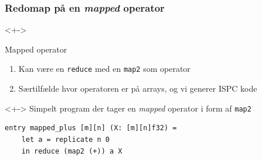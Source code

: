 \documentclass[t]{beamer}
\begin{document}
\begin{frame}[fragile]
  \frametitle{Redomap på en \textit{mapped} operator}
  \begin{onlyenv}<+->
    \begin{block}{Mapped operator}
      \begin{enumerate}
        \item Kan være en \texttt{reduce} med en \texttt{map2} som operator
        \item Særtilfælde hvor operatoren er på arrays, og vi generer ISPC kode
      \end{enumerate}
    \end{block}
  \end{onlyenv}
  \begin{onlyenv}<+->
    Simpelt program der tager en \textit{mapped} operator i form af \texttt{map2}
\begin{lstlisting}[language=futhark]
  entry mapped_plus [m][n] (X: [m][n]f32) =
    let a = replicate n 0
    in reduce (map2 (+)) a X

\end{lstlisting}
  \end{onlyenv}
\end{frame}
\end{document}

